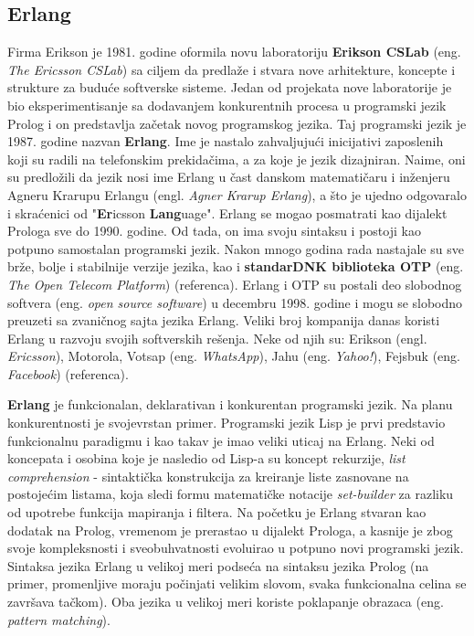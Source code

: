 \documentclass[12pt,oneside]{memoir}
\begin{document}
\newpage

\subsection{Erlang}
Firma Erikson je 1981. godine oformila novu laboratoriju \textbf{Erikson CSLab} (eng. \textit{The Ericsson CSLab}) sa ciljem da predlaže i stvara nove arhitekture, koncepte i strukture za buduće softverske sisteme. Jedan od projekata nove laboratorije  je bio eksperimentisanje sa dodavanjem konkurentnih procesa u programski jezik Prolog i on predstavlja začetak novog programskog jezika. Taj programski jezik je 1987. godine nazvan \textbf{Erlang}. Ime je nastalo zahvaljujući inicijativi zaposlenih koji su radili na telefonskim prekidačima, a  za koje je jezik dizajniran. Naime, oni su predložili da jezik nosi ime Erlang u čast danskom matematičaru i inženjeru Agneru Krarupu Erlangu (engl. \textit{Agner Krarup Erlang}), a što je ujedno odgovaralo i skraćenici od  "\textbf{Er}icsson \textbf{Lang}uage".  Erlang se mogao posmatrati kao dijalekt Prologa sve do 1990. godine. Od tada, on ima svoju sintaksu i postoji kao potpuno samostalan programski
jezik. Nakon mnogo godina rada nastajale su sve brže, bolje i stabilnije verzije jezika, kao i \textbf{standarDNK biblioteka OTP} (eng. \textit{The Open Telecom Platform}) (referenca). Erlang i OTP su postali deo slobodnog softvera (eng. \textit{open source software}) u decembru 1998. godine i mogu se slobodno preuzeti sa zvaničnog sajta jezika Erlang. Veliki broj kompanija danas koristi Erlang u razvoju svojih softverskih rešenja. Neke od
njih su: Erikson (engl. \textit{Ericsson}), Motorola, Votsap (eng. \textit{WhatsApp}), Jahu (eng. \textit{Yahoo!}),
Fejsbuk (eng. \textit{Facebook}) (referenca).

\textbf{Erlang} je funkcionalan, deklarativan i konkurentan programski jezik. Na planu konkurentnosti je
svojevrstan primer. Programski jezik Lisp je prvi predstavio funkcionalnu paradigmu i kao takav je imao veliki uticaj na Erlang. Neki od koncepata i osobina koje je nasledio od Lisp-a su koncept rekurzije, \textit{list comprehension} - sintaktička konstrukcija za kreiranje liste zasnovane na postojećim listama, koja sledi formu matematičke notacije \textit{set-builder} za razliku od upotrebe funkcija mapiranja i filtera. Na početku je Erlang stvaran kao dodatak na Prolog, vremenom je prerastao
u dijalekt Prologa, a kasnije je zbog svoje kompleksnosti i sveobuhvatnosti evoluirao u potpuno novi programski jezik. Sintaksa jezika Erlang u velikoj meri podseća na sintaksu jezika Prolog (na primer, promenljive moraju počinjati velikim slovom, svaka funkcionalna celina se završava tačkom). Oba jezika u velikoj meri koriste poklapanje obrazaca (eng. \textit{pattern matching}).
\end{document}

